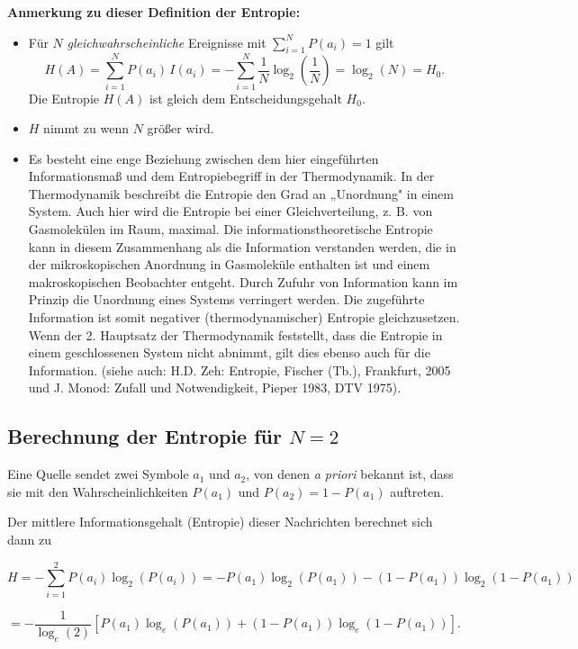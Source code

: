 \textbf{Anmerkung zu dieser Definition der Entropie:}

\begin{itemize}
  \item Für $N$ \textit{gleichwahrscheinliche} Ereignisse mit $\sum_{i=1}^{N} P(a_i) = 1$ gilt
$$
H(A) = \sum_{i=1}^{N} P(a_i)\, I(a_i) = -\sum_{i=1}^{N} \frac{1}{N} \log_2\!\left(\frac{1}{N}\right) = \log_2(N) = H_0.
$$
Die Entropie $H(A)$ ist gleich dem Entscheidungsgehalt $H_0$.

  \item $H$ nimmt zu wenn $N$ größer wird.

  \item Es besteht eine enge Beziehung zwischen dem hier eingeführten Informationsmaß und dem Entropiebegriff in der Thermodynamik. In der Thermodynamik beschreibt die Entropie den Grad an „Unordnung" in einem System. Auch hier wird die Entropie bei einer Gleichverteilung, z. B. von Gasmolekülen im Raum, maximal. Die informationstheoretische Entropie kann in diesem Zusammenhang als die Information verstanden werden, die in der mikroskopischen Anordnung in Gasmoleküle enthalten ist und einem makroskopischen Beobachter entgeht. Durch Zufuhr von Information kann im Prinzip die Unordnung eines Systems verringert werden. Die zugeführte Information ist somit negativer (thermodynamischer) Entropie gleichzusetzen. Wenn der 2. Hauptsatz der Thermodynamik feststellt, dass die Entropie in einem geschlossenen System nicht abnimmt, gilt dies ebenso auch für die Information. (siehe auch: H.D. Zeh: Entropie, Fischer (Tb.), Frankfurt, 2005 und J. Monod: Zufall und Notwendigkeit, Pieper 1983, DTV 1975).
\end{itemize}

\subsection{Berechnung der Entropie für $N = 2$}
\label{sec:entropie-binaer}

Eine Quelle sendet zwei Symbole $a_1$ und $a_2$, von denen \textit{a priori} bekannt ist, dass sie mit den Wahrscheinlichkeiten $P(a_1)$ und $P(a_2) = 1 - P(a_1)$ auftreten.

Der mittlere Informationsgehalt (Entropie) dieser Nachrichten berechnet sich dann zu

$$
H = -\sum_{i=1}^{2} P(a_i)\log_2(P(a_i))
= -P(a_1)\log_2(P(a_1)) - (1-P(a_1))\log_2(1-P(a_1))
$$

$$
= -\frac{1}{\log_e(2)}\left[P(a_1)\log_e(P(a_1)) + (1-P(a_1))\log_e(1-P(a_1))\right].
$$

